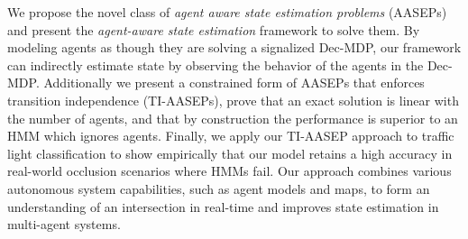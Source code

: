 \documentclass[letterpaper,10pt,conference]{ieeeconf}
\begin{document}
We propose the novel class of \emph{agent aware state estimation problems} (AASEPs) and present the \emph{agent-aware state estimation} framework to solve them. By modeling agents as though they are solving a signalized Dec-MDP, our framework can indirectly estimate state by observing the behavior of the agents in the Dec-MDP. Additionally we present a constrained form of AASEPs that enforces transition independence (TI-AASEPs), prove that an exact solution is linear with the number of agents, and that by construction the performance is superior to an HMM which ignores agents. Finally, we apply our TI-AASEP approach to traffic light classification to show empirically that our model retains a high accuracy in real-world occlusion scenarios where HMMs fail. Our approach combines various autonomous system capabilities, such as agent models and maps, to form an understanding of an intersection in real-time and improves state estimation in multi-agent systems.



\end{document}

